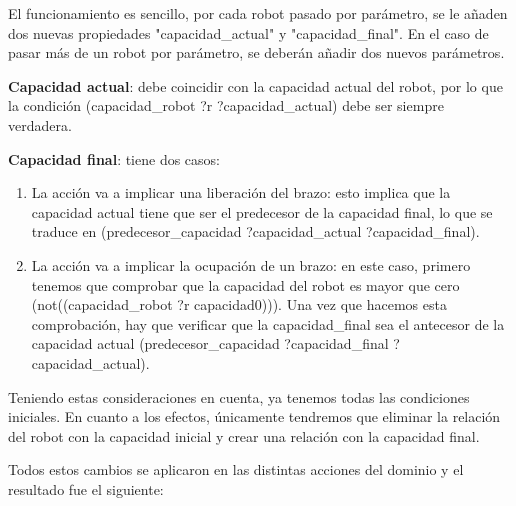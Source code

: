 \documentclass{article}
\begin{document}
El funcionamiento es sencillo, por cada robot pasado por parámetro, se le añaden dos nuevas propiedades "capacidad\_actual" y "capacidad\_final". En el caso de pasar más de un robot por parámetro, se deberán añadir dos nuevos parámetros.

\textbf{Capacidad actual}: debe coincidir con la capacidad actual del robot, por lo que la condición (capacidad\_robot ?r ?capacidad\_actual) debe ser siempre verdadera.

\textbf{Capacidad final}: tiene dos casos:
\begin{enumerate}
    \item La acción va a implicar una liberación del brazo: esto implica que la capacidad actual tiene que ser el predecesor de la capacidad final, lo que se traduce en (predecesor\_capacidad ?capacidad\_actual ?capacidad\_final).
    \item La acción va a implicar la ocupación de un brazo: en este caso, primero tenemos que comprobar que la capacidad del robot es mayor que cero (not((capacidad\_robot ?r capacidad0))). Una vez que hacemos esta comprobación, hay que verificar que la capacidad\_final sea el antecesor de la capacidad actual (predecesor\_capacidad ?capacidad\_final ?capacidad\_actual).
\end{enumerate}

Teniendo estas consideraciones en cuenta, ya tenemos todas las condiciones iniciales. En cuanto a los efectos, únicamente tendremos que eliminar la relación del robot con la capacidad inicial y crear una relación con la capacidad final.

Todos estos cambios se aplicaron en las distintas acciones del dominio y el resultado fue el siguiente:
\end{document}
